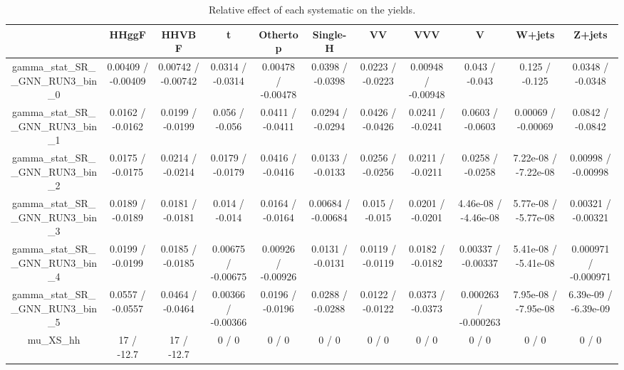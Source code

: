 \documentclass[10pt]{article}
\begin{document}
\begin{table}[htbp]
\begin{center}
\begin{tabular}{|c|c|c|c|c|c|c|c|c|c|c|}
\hline 
      & HHggF      & HHVBF      & t      & Othertop      & Single-H      & VV      & VVV      & V      & W+jets      & Z+jets \\ 
\hline 
  gamma_stat_SR__GNN_RUN3_bin_0 & 0.00409 / -0.00409 & 0.00742 / -0.00742 & 0.0314 / -0.0314 & 0.00478 / -0.00478 & 0.0398 / -0.0398 & 0.0223 / -0.0223 & 0.00948 / -0.00948 & 0.043 / -0.043 & 0.125 / -0.125 & 0.0348 / -0.0348 \\ 
  gamma_stat_SR__GNN_RUN3_bin_1 & 0.0162 / -0.0162 & 0.0199 / -0.0199 & 0.056 / -0.056 & 0.0411 / -0.0411 & 0.0294 / -0.0294 & 0.0426 / -0.0426 & 0.0241 / -0.0241 & 0.0603 / -0.0603 & 0.00069 / -0.00069 & 0.0842 / -0.0842 \\ 
  gamma_stat_SR__GNN_RUN3_bin_2 & 0.0175 / -0.0175 & 0.0214 / -0.0214 & 0.0179 / -0.0179 & 0.0416 / -0.0416 & 0.0133 / -0.0133 & 0.0256 / -0.0256 & 0.0211 / -0.0211 & 0.0258 / -0.0258 & 7.22e-08 / -7.22e-08 & 0.00998 / -0.00998 \\ 
  gamma_stat_SR__GNN_RUN3_bin_3 & 0.0189 / -0.0189 & 0.0181 / -0.0181 & 0.014 / -0.014 & 0.0164 / -0.0164 & 0.00684 / -0.00684 & 0.015 / -0.015 & 0.0201 / -0.0201 & 4.46e-08 / -4.46e-08 & 5.77e-08 / -5.77e-08 & 0.00321 / -0.00321 \\ 
  gamma_stat_SR__GNN_RUN3_bin_4 & 0.0199 / -0.0199 & 0.0185 / -0.0185 & 0.00675 / -0.00675 & 0.00926 / -0.00926 & 0.0131 / -0.0131 & 0.0119 / -0.0119 & 0.0182 / -0.0182 & 0.00337 / -0.00337 & 5.41e-08 / -5.41e-08 & 0.000971 / -0.000971 \\ 
  gamma_stat_SR__GNN_RUN3_bin_5 & 0.0557 / -0.0557 & 0.0464 / -0.0464 & 0.00366 / -0.00366 & 0.0196 / -0.0196 & 0.0288 / -0.0288 & 0.0122 / -0.0122 & 0.0373 / -0.0373 & 0.000263 / -0.000263 & 7.95e-08 / -7.95e-08 & 6.39e-09 / -6.39e-09 \\ 
  mu_XS_hh & 17 / -12.7 & 17 / -12.7 & 0 / 0 & 0 / 0 & 0 / 0 & 0 / 0 & 0 / 0 & 0 / 0 & 0 / 0 & 0 / 0 \\ 
\hline 
\end{tabular} 
\caption{Relative effect of each systematic on the yields.} 
\end{center} 
\end{table} 
\end{document}
